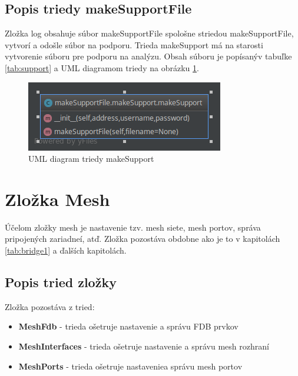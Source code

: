 \subsection{Popis triedy makeSupportFile}
Zložka log obsahuje súbor makeSupportFile spološne striedou makeSupportFile, vytvorí a odošle súbor na podporu. Trieda makeSupport má na starosti vytvorenie súboru pre podporu na analýzu. Obsah súboru je popísanýv tabuľke \ref{tab:support} a UML diagramom triedy na obrázku \ref{fig:support}.
\begin{table}[]
\caption{Tabuľka metód triedy makeSupport}
\label{tab:support}
\end{table}
\begin{figure}[H]
\centering
\includegraphics[scale=0.6]{../text/support.png}
\caption{UML diagram triedy makeSupport}
\label{fig:support}
\end{figure}
\section{Zložka Mesh}
Účelom zložky mesh je nastavenie tzv. mesh siete, mesh portov, správa pripojených zariadneí, atď. Zložka pozostáva obdobne ako je to v kapitolách \ref{tab:bridge1} a ďalších kapitolách.
\subsection{Popis tried zložky}
Zložka pozostáva z tried:
\begin{itemize}
\item \textbf{MeshFdb} - trieda ošetruje nastavenie a správu FDB prvkov
\item \textbf{MeshInterfaces} - trieda ošetruje nastavenie a správu mesh rozhraní
\item \textbf{MeshPorts} - trieda ošetruje nastaveniea správu mesh portov
\end{itemize}
